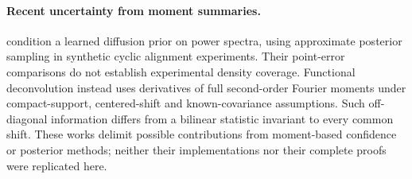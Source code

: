 \paragraph{Recent uncertainty from moment summaries.}
\citet{janson2026mps} condition a learned diffusion prior on power spectra,
using approximate posterior sampling in synthetic cyclic alignment experiments.
Their point-error comparisons do not establish experimental density coverage.
Functional deconvolution \citep{alghattas2026functional} instead uses derivatives
of full second-order Fourier moments under compact-support, centered-shift and
known-covariance assumptions. Such off-diagonal information differs from a
bilinear statistic invariant to every common shift. These works delimit
possible contributions from moment-based confidence or posterior methods;
neither their implementations nor their complete proofs were replicated here.
